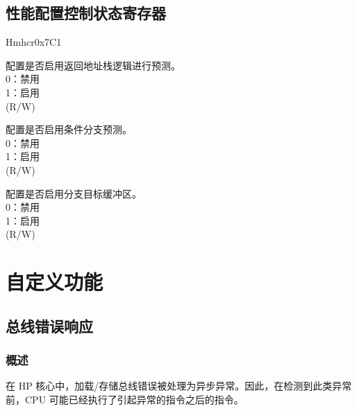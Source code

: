 \documentclass[main\_\_CN.tex]{subfiles}
\begin{document}
 \subsection{性能配置控制状态寄存器}
\label{sec:riscvcpu-perf-csr}
\begin{register}{H}{mhcr}{0x7C1}\label{regdesc:MHCR}
%
%
%
%
%
%
\regnewline%
\begin{regdesc}\begin{reglist}
\label{fielddesc:MHCRRS}\item [RS] 配置是否启用返回地址栈逻辑进行预测。\\
0：禁用 \\
1：启用 \\
(R/W)
\label{fielddesc:MHCRBPE}\item [BPE] 配置是否启用条件分支预测。\\
0：禁用 \\
1：启用 \\
(R/W)
\label{fielddesc:MHCRBTB}\item [BTB]配置是否启用分支目标缓冲区。\\
0：禁用 \\
1：启用 \\
(R/W)
\end{reglist}\end{regdesc}
\end{register}
\newpage
\section{自定义功能}


\subsection{总线错误响应}
\label{sec:riscvcpu-bus-err-resp}
\subsubsection{概述}
\label{sec:riscvcpu-buserr-overview}

在 HP 核心中，加载/存储总线错误被处理为异步异常。因此，在检测到此类异常前，CPU 可能已经执行了引起异常的指令之后的指令。
\end{document}
